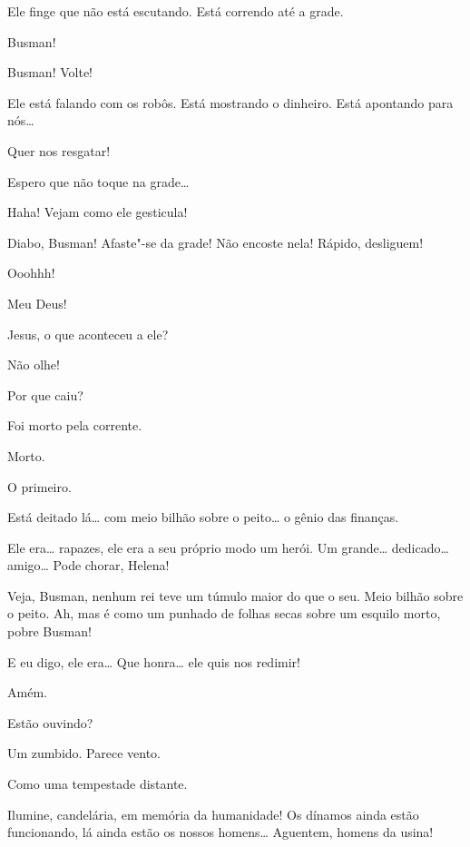  Ele finge que não está escutando. Está correndo até a grade.

 Busman!

  Busman! Volte!

 Ele está falando com os robôs. Está mostrando o dinheiro. Está
apontando para nós\ldots{}

 Quer nos resgatar!

 Espero que não toque na grade\ldots{}

 Haha! Vejam como ele gesticula!

  Diabo, Busman! Afaste"-se da grade! Não encoste nela!
 Rápido, desliguem!

 Ooohhh!

 Meu Deus!

 Jesus, o que aconteceu a ele?

  Não olhe!

 Por que caiu?

 Foi morto pela corrente.

 Morto.

  O primeiro.


 Está deitado lá\ldots{} com meio bilhão sobre o peito\ldots{} o gênio das
finanças.

 Ele era\ldots{} rapazes, ele era a seu próprio modo um herói. Um
grande\ldots{} dedicado\ldots{} amigo\ldots{} Pode chorar, Helena!

  Veja, Busman, nenhum rei teve um túmulo maior do
que o seu. Meio bilhão sobre o peito. Ah, mas é como um punhado de folhas secas
sobre um esquilo morto, pobre Busman!

 E eu digo, ele era\ldots{} Que honra\ldots{} ele quis nos redimir!

  Amém.


 Estão ouvindo?

 Um zumbido. Parece vento.

 Como uma tempestade distante.

  Ilumine, candelária, em memória da
humanidade! Os dínamos ainda estão funcionando, lá ainda estão os nossos homens\ldots{}
Aguentem, homens da usina!


